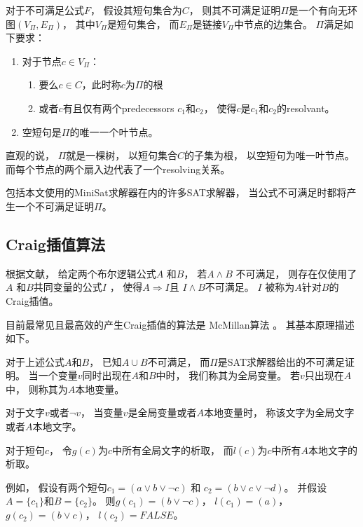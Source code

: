 \begin{definition}
对于不可满足公式$F$，
假设其短句集合为$C$，
则其不可满足证明$\Pi$是一个有向无环图$(V_{\Pi},E_{\Pi})$，
其中$V_{\Pi}$是短句集合，
而$E_{\Pi}$是链接$V_{\Pi}$中节点的边集合。
$\Pi$满足如下要求：
\begin{enumerate}
\item 对于节点$c\in V_{\Pi}$：
  \begin{enumerate}
    \item 要么$c\in C$，此时称$c$为$\Pi$的根
    \item 或者$c$有且仅有两个predecessors $c_1$和$c_2$，
    使得$c$是$c_1$和$c_2$的resolvant。
  \end{enumerate}
\item 空短句是$\Pi$的唯一一个叶节点。
\end{enumerate}
\end{definition}

直观的说，
$\Pi$就是一棵树，
以短句集合$C$的子集为根，
以空短句为唯一叶节点。
而每个节点的两个扇入边代表了一个resolving关系。

包括本文使用的MiniSat求解器在内的许多SAT求解器，
当公式不可满足时都将产生一个不可满足证明$\Pi$。

\subsection{Craig插值算法}

根据文献，
给定两个布尔逻辑公式$A$ 和$B$，
若$A\wedge B$ 不可满足，
则存在仅使用了$A$ 和$B$共同变量的公式$I$ ，
使得$A\Rightarrow I$且
$I\wedge B$不可满足。
$I$ 被称为$A$针对$B$的Craig插值。

目前最常见且最高效的产生Craig插值的算法是
McMillan算法 。
其基本原理描述如下。

对于上述公式$A$和$B$，
已知$A\cup B$不可满足，
而$\Pi$是SAT求解器给出的不可满足证明。
当一个变量$v$同时出现在$A$和$B$中时，
我们称其为全局变量。
若$v$只出现在$A$中，
则称其为$A$本地变量。

对于文字$v$或者$\neg v$，
当变量$v$是全局变量或者$A$本地变量时，
称该文字为全局文字或者$A$本地文字。

对于短句$c$，
令$g(c)$为$c$中所有全局文字的析取，
而$l(c)$为$c$中所有$A$本地文字的析取。

例如，
假设有两个短句$c_1=(a\vee b\vee\neg c)$ 和
$c_2=(b\vee c\vee\neg d)$。
并假设$A=\{c_1\}$和$B=\{c_2\}$。
则$g(c_1)=(b\vee\neg c)$，
$l(c_1)=(a)$，
$g(c_2)=(b\vee c)$，
$l(c_2)=FALSE$。


